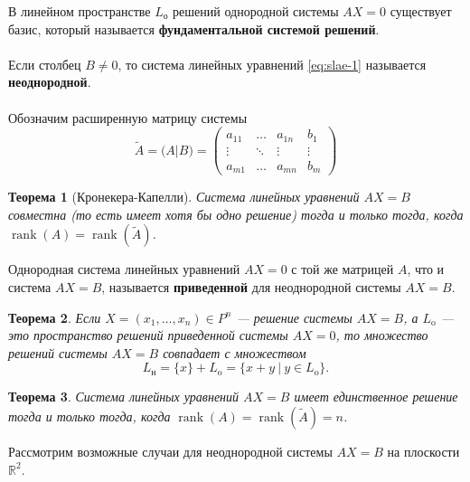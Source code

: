 \documentclass[a4paper, 12pt]{report}
\numberwithin{equation}{section}
\newcommand{\rank}{\operatorname{rank}}
\newtheorem*{theorem}{Теорема}
\begin{document}
	{В линейном пространстве $L_\text{о}$ решений однородной системы $AX = 0$ существует базис, который называется \textbf{фундаментальной системой решений}.}
	\\\\
	{Если столбец $B\ne 0$, то система линейных уравнений \eqref{eq:slae-1} называется \textbf{неоднородной}.}
	\\\\
	Обозначим расширенную матрицу системы
	\begin{equation*}
		\widetilde A = \Big(A | B\Big) = \begin{pmatrix}
			a_{11} & \ldots & a_{1n} & b_1\\
			\vdots & \ddots & \vdots & \vdots \\
			a_{m1} & \ldots & a_{mn} & b_{m}
		\end{pmatrix}
	\end{equation*}
	\begin{theorem}
		[Кронекера-Капелли]
		Система линейных уравнений $AX = B$ совместна (то есть имеет хотя бы одно решение) тогда и только тогда, когда $\rank (A) = \rank (\widetilde{A})$.
	\end{theorem}
	\noindent
	{Однородная система линейных уравнений $AX = 0$ с той же матрицей $A$, что и система $AX = B$, называется \textbf{приведенной} для неоднородной системы $AX = B$.}
	\begin{theorem}
		Если $X = (x_1,\dots,x_n) \in P^n$ --- решение системы $AX = B$, а $L_\text{o}$ --- это пространство решений приведенной системы $AX = 0$, то множество решений системы $AX = B$ совпадает с множеством \begin{equation}
			L_\text{н} = \{x\} + L_\text{o} = \{ x + y \ | \ y\in L_\text{o} \}.
		\end{equation}
	\end{theorem}
	\begin{theorem}
		Система линейных уравнений $AX = B$ имеет единственное решение тогда и только тогда, когда $\rank(A) = \rank(\widetilde A) = n$.
	\end{theorem}
	\noindent
	Рассмотрим возможные случаи для неоднородной системы $AX = B$ на плоскости $\mathbb R^2$.
\end{document}
